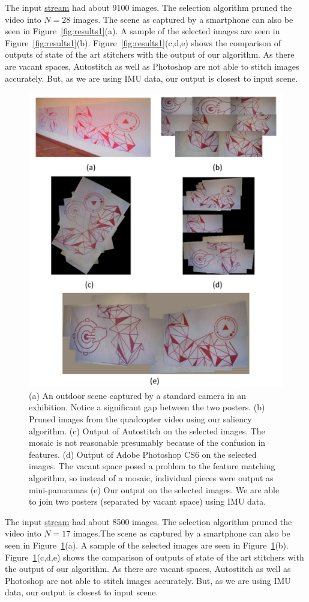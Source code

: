 \documentclass[10pt,twocolumn,letterpaper]{article}
\begin{document}
The input \href{videos/orangeBlue.avi}{stream} had about 9100 images. The
selection algorithm pruned the video into $N=28$ images. The scene as captured by a smartphone can also be seen in
Figure~\ref{fig:results1}(a). A sample of the
selected images are seen in Figure~\ref{fig:results1}(b).
Figure~\ref{fig:results1}(c,d,e) shows the comparison of outputs of state
of the art stitchers with the output of our algorithm. As there are vacant
spaces, Autostitch as well as Photoshop are not able to stitch images
accurately. But, as we are using IMU data, our output is closest to input scene. 

\begin{figure}[h!]
\centering
\includegraphics[width=0.85\linewidth]{figures/Purple_red.pdf}
\caption{(a) An outdoor scene captured by a standard camera in an
  exhibition. Notice a   significant gap between the two posters.  (b) Pruned
  images from the quadcopter video using our saliency algorithm. (c) Output of
  Autostitch on the selected images. The mosaic is not reasonable
  presumably because of the confusion in features. (d) Output of Adobe
  Photoshop CS6 on the selected images. The vacant space posed a
  problem to the feature matching algorithm, so instead of a mosaic,
  individual pieces were output as mini-panoramas (e) Our output on
  the selected images. We are able to join two posters (separated by
  vacant space) using IMU data.}
\label{fig:results2}
\end{figure}
	
The input \href{videos/purpleRed.avi}{stream} had about 8500 images. The
selection algorithm pruned the video into $N=17$ images.The scene as captured by a smartphone can also be seen in
Figure~\ref{fig:results2}(a). A sample of the
selected images are seen in Figure~\ref{fig:results2}(b).
Figure~\ref{fig:results2}(c,d,e) shows the comparison of outputs of state
of the art stitchers with the output of our algorithm. As there are vacant
spaces, Autostitch as well as Photoshop are not able to stitch images
accurately. But, as we are using IMU data, our output is closest to input scene.
	
\end{document}
